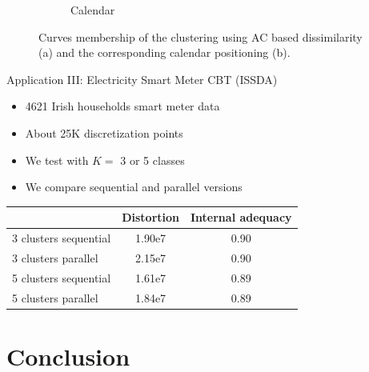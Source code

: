 \documentclass[xcolor=dvipsnames, smaller]{beamer}
\begin{document}
\begin{frame}
\begin{figure}
\begin{subfigure}[t]{0.45\textwidth}
    \caption{Calendar}
  \end{subfigure}
\caption{Curves membership of the clustering using AC based dissimilarity (a) and the corresponding calendar positioning (b).}
  \end{figure}
\end{frame}




\begin{frame}{Application III: Electricity Smart Meter CBT (ISSDA)} \small


\begin{itemize}
 \item 4621 Irish households smart meter data %
 \item About 25K discretization points 
 \item We test with $K=$ 3 or 5 classes
 \item We compare sequential and parallel versions 
\end{itemize}


\begin{table}[H]
\centering
\begin{tabular}{lcc}                       \toprule
 & Distortion & Internal adequacy  \\ \midrule
3 clusters sequential & 1.90e7 & 0.90   \\
3 clusters parallel   & 2.15e7 & 0.90   \\
5 clusters sequential & 1.61e7 & 0.89   \\
5 clusters parallel   & 1.84e7 & 0.89   \\ \bottomrule
\end{tabular}
\label{tabDistorIr}
\end{table}

\end{frame}


\section{Conclusion}
\end{document}

